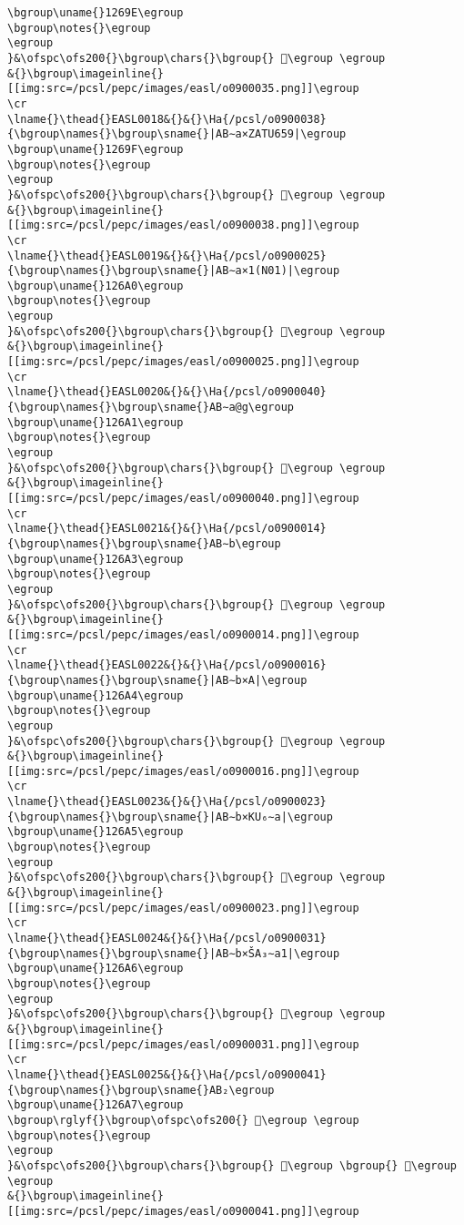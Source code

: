 \begin{verbatim}
\bgroup\uname{}1269E\egroup
\bgroup\notes{}\egroup
\egroup
}&\ofspc\ofs200{}\bgroup\chars{}\bgroup{} 𒚞\egroup \egroup
&{}\bgroup\imageinline{}[[img:src=/pcsl/pepc/images/easl/o0900035.png]]\egroup
\cr
\lname{}\thead{}EASL0018&{}&{}\Ha{/pcsl/o0900038}{\bgroup\names{}\bgroup\sname{}|AB∼a×ZATU659|\egroup
\bgroup\uname{}1269F\egroup
\bgroup\notes{}\egroup
\egroup
}&\ofspc\ofs200{}\bgroup\chars{}\bgroup{} 𒚟\egroup \egroup
&{}\bgroup\imageinline{}[[img:src=/pcsl/pepc/images/easl/o0900038.png]]\egroup
\cr
\lname{}\thead{}EASL0019&{}&{}\Ha{/pcsl/o0900025}{\bgroup\names{}\bgroup\sname{}|AB∼a×1(N01)|\egroup
\bgroup\uname{}126A0\egroup
\bgroup\notes{}\egroup
\egroup
}&\ofspc\ofs200{}\bgroup\chars{}\bgroup{} 𒚠\egroup \egroup
&{}\bgroup\imageinline{}[[img:src=/pcsl/pepc/images/easl/o0900025.png]]\egroup
\cr
\lname{}\thead{}EASL0020&{}&{}\Ha{/pcsl/o0900040}{\bgroup\names{}\bgroup\sname{}AB∼a@g\egroup
\bgroup\uname{}126A1\egroup
\bgroup\notes{}\egroup
\egroup
}&\ofspc\ofs200{}\bgroup\chars{}\bgroup{} 𒚡\egroup \egroup
&{}\bgroup\imageinline{}[[img:src=/pcsl/pepc/images/easl/o0900040.png]]\egroup
\cr
\lname{}\thead{}EASL0021&{}&{}\Ha{/pcsl/o0900014}{\bgroup\names{}\bgroup\sname{}AB∼b\egroup
\bgroup\uname{}126A3\egroup
\bgroup\notes{}\egroup
\egroup
}&\ofspc\ofs200{}\bgroup\chars{}\bgroup{} 𒚣\egroup \egroup
&{}\bgroup\imageinline{}[[img:src=/pcsl/pepc/images/easl/o0900014.png]]\egroup
\cr
\lname{}\thead{}EASL0022&{}&{}\Ha{/pcsl/o0900016}{\bgroup\names{}\bgroup\sname{}|AB∼b×A|\egroup
\bgroup\uname{}126A4\egroup
\bgroup\notes{}\egroup
\egroup
}&\ofspc\ofs200{}\bgroup\chars{}\bgroup{} 𒚤\egroup \egroup
&{}\bgroup\imageinline{}[[img:src=/pcsl/pepc/images/easl/o0900016.png]]\egroup
\cr
\lname{}\thead{}EASL0023&{}&{}\Ha{/pcsl/o0900023}{\bgroup\names{}\bgroup\sname{}|AB∼b×KU₆∼a|\egroup
\bgroup\uname{}126A5\egroup
\bgroup\notes{}\egroup
\egroup
}&\ofspc\ofs200{}\bgroup\chars{}\bgroup{} 𒚥\egroup \egroup
&{}\bgroup\imageinline{}[[img:src=/pcsl/pepc/images/easl/o0900023.png]]\egroup
\cr
\lname{}\thead{}EASL0024&{}&{}\Ha{/pcsl/o0900031}{\bgroup\names{}\bgroup\sname{}|AB∼b×ŠA₃∼a1|\egroup
\bgroup\uname{}126A6\egroup
\bgroup\notes{}\egroup
\egroup
}&\ofspc\ofs200{}\bgroup\chars{}\bgroup{} 𒚦\egroup \egroup
&{}\bgroup\imageinline{}[[img:src=/pcsl/pepc/images/easl/o0900031.png]]\egroup
\cr
\lname{}\thead{}EASL0025&{}&{}\Ha{/pcsl/o0900041}{\bgroup\names{}\bgroup\sname{}AB₂\egroup
\bgroup\uname{}126A7\egroup
\bgroup\rglyf{}\bgroup\ofspc\ofs200{} 𒚧\egroup \egroup
\bgroup\notes{}\egroup
\egroup
}&\ofspc\ofs200{}\bgroup\chars{}\bgroup{} 𒚧\egroup \bgroup{} 𒚩\egroup \egroup
&{}\bgroup\imageinline{}[[img:src=/pcsl/pepc/images/easl/o0900041.png]]\egroup

\end{verbatim}
